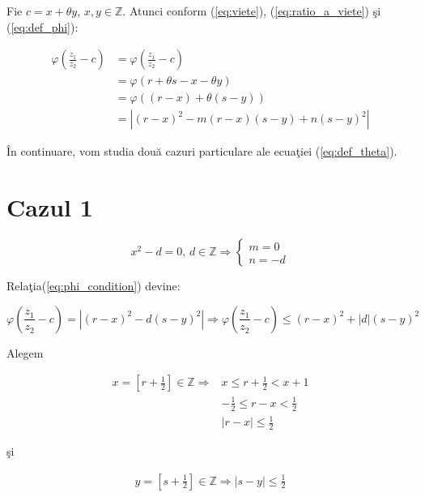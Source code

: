 \documentclass[12t]{article}
\begin{document}
Fie $c = x + \theta y$, $x, y \in \mathbb{Z}$.
Atunci conform (\ref{eq:viete}), (\ref{eq:ratio_a_viete}) şi (\ref{eq:def_phi}):

\begin{equation} \label{eq:phi_condition}
\begin{split}
    \varphi  \left(\frac{z_1}{z_2} - c\right) & =\varphi  \left(\frac{z_1}{z_2} - c\right) \\
    &=\varphi(r + \theta s - x - \theta y) \\
    &= \varphi \left( (r-x) + \theta(s-y) \right) \\
    &=  \left| (r-x)^2 - m(r-x)(s-y) + n(s-y)^2\right|
\end{split}
\end{equation}

În continuare, vom studia două cazuri particulare ale ecuaţiei (\ref{eq:def_theta}).

\section*{Cazul 1} 
\begin{equation} \label{eq:case_1}
    x^2 - d = 0, \, d \in \mathbb{Z} \Rightarrow \begin{cases} m = 0 \\ n = -d \end{cases}
\end{equation}

Relaţia(\ref{eq:phi_condition}) devine:

\begin{equation} \label{eq:phi_condition_case1}
    \varphi \left(\frac{z_1}{z_2} - c\right)  = \left| (r-x)^2 - d(s-y)^2 \right| 
   \Rightarrow \varphi \left(\frac{z_1}{z_2} - c\right) \leq (r-x)^2 + |d|(s-y)^2
\end{equation}

Alegem

\begin{equation}
\begin{split}
    x = \left[ r + \frac{1}{2} \right] \in \mathbb{Z} \Rightarrow & x \leq r + \frac{1}{2} < x + 1 \\
    & -\frac{1}{2} \leq r - x < \frac{1}{2} \\
    & \boxed{|r - x| \leq \frac{1}{2}}
\end{split}
\end{equation}

şi

\begin{equation}
\begin{split}
    y = \left[ s + \frac{1}{2} \right] \in \mathbb{Z} \Rightarrow \boxed{|s - y| \leq \frac{1}{2}}
\end{split}
\end{equation}
\end{document}
